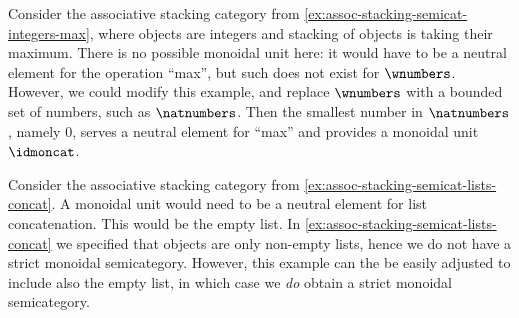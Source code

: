 
\begin{example}
Consider the associative stacking category from \cref{ex:assoc-stacking-semicat-integers-max}, where objects are integers and stacking of objects is taking their maximum. There is no possible monoidal unit here: it would have to be a neutral element for the operation ``max'', but such does not exist for $\wnumbers$. However, we could modify this example, and replace $\wnumbers$ with a bounded set of numbers, such as $\natnumbers$. Then the smallest number in $\natnumbers$, namely $0$, serves a neutral element for ``max'' and provides a monoidal unit $\idmoncat$.
\end{example}

\begin{example}
Consider the associative stacking category from \cref{ex:assoc-stacking-semicat-lists-concat}. 
A monoidal unit would need to be a neutral element for list concatenation. This would be the empty list. In \cref{ex:assoc-stacking-semicat-lists-concat} we specified that objects are only non-empty lists, hence we do not have a strict monoidal semicategory. However, this example can the be easily adjusted to include also the empty list, in which case we \emph{do} obtain a strict monoidal semicategory. 
\end{example}

